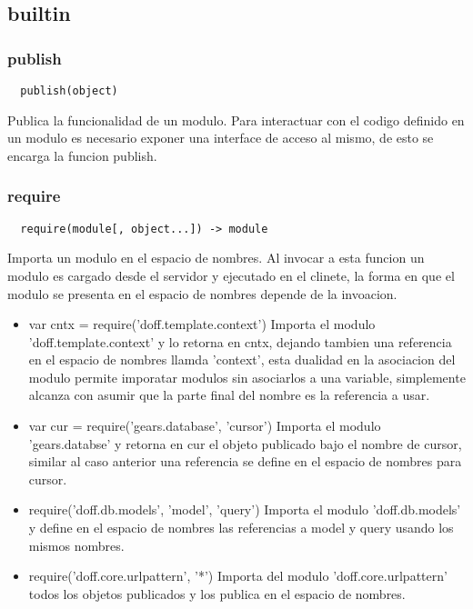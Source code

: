 \subsection{builtin}

\subsubsection*{publish}
\begin{verbatim}
  publish(object)
\end{verbatim}
Publica la funcionalidad de un modulo. 
Para interactuar con el codigo definido en un modulo es necesario
exponer una interface de acceso al mismo, de esto se encarga la funcion publish.

\subsubsection*{require}
\begin{verbatim}
  require(module[, object...]) -> module
\end{verbatim} 
Importa un modulo en el espacio de nombres.
Al invocar a esta funcion un modulo es cargado desde el servidor y ejecutado en
el clinete, la forma en que el modulo se presenta en el espacio de nombres
depende de la invoacion.
\begin{itemize}
 \item{var cntx = require('doff.template.context')}
  Importa el modulo 'doff.template.context' y lo retorna en cntx, dejando
tambien una referencia en el espacio de nombres llamda 'context', esta dualidad
en la asociacion del modulo permite imporatar modulos sin asociarlos a una
variable, simplemente alcanza con asumir que la parte final del nombre es la
referencia a usar.
 \item{var cur = require('gears.database', 'cursor')}
  Importa el modulo 'gears.databse' y retorna en cur el objeto publicado bajo el
nombre de cursor, similar al caso anterior una referencia se define en el
espacio de nombres para cursor.  
 \item{require('doff.db.models', 'model', 'query')}
  Importa el modulo 'doff.db.models' y define en el espacio de nombres las
referencias a model y query usando los mismos nombres.
 \item{require('doff.core.urlpattern', '*')}
  Importa del modulo 'doff.core.urlpattern' todos los objetos publicados y los
publica en el espacio de nombres.
\end{itemize}

